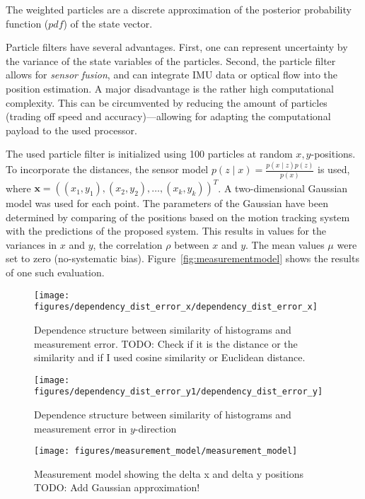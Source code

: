 \documentclass{report}
\begin{document}
The weighted particles are a discrete approximation of the posterior
probability function ($pdf$) of the state vector.

Particle filters have several advantages. First, one can represent
uncertainty by the variance of the state variables of the
particles. Second, the particle filter allows for \emph{sensor
  fusion}, and can integrate IMU data or optical flow into the
position estimation.  A major disadvantage is the rather high
computational complexity. This can be circumvented by reducing the
amount of particles (trading off speed and accuracy)---allowing for
adapting the computational payload to the used processor.

The used particle filter is initialized using 100 particles at random
$x, y$-positions. To incorporate the distances, the sensor model
$p(z \mid x) = \frac{p(x \mid z)p(z)}{p(x)}$ is used, where
$\textbf{x} = ((x_1, y_1), (x_2, y_2), \ldots, (x_k, y_k))^T$. A
two-dimensional Gaussian model was used for each point. The parameters
of the Gaussian have been determined by comparing of the positions
based on the motion tracking system with the predictions of the
proposed system. This results in values for the variances in $x$ and
$y$, the correlation $\rho$ between $x$ and $y$. The mean values $\mu$
were set to zero (no-systematic
bias). Figure~\ref{fig:measurementmodel} shows the results of one such
evaluation.

\begin{figure}[h!]
\begin{center}
  \texttt{[image: figures/dependency\_dist\_error\_x/dependency\_dist\_error\_x]}
  \caption{{\label{fig:cor_sim_confi} Dependence structure between
      similarity of histograms and measurement error.  TODO: Check if
      it is the distance or the similarity and if I used cosine
      similarity or Euclidean distance.%
    }}
\end{center}
\end{figure}

\begin{figure}[h!]
\begin{center}
\texttt{[image: figures/dependency\_dist\_error\_y1/dependency\_dist\_error\_y]}
\caption{{\label{fig:cor_sim_confi_y}
Dependence structure between similarity of histograms and measurement error in $y$-direction%
}}
\end{center}
\end{figure}

\begin{figure}[h!]
\begin{center}
\texttt{[image: figures/measurement\_model/measurement\_model]}
\caption{{Measurement model showing the delta x and delta y
    positions
TODO: Add Gaussian approximation!%
}}
\end{center}
\end{figure}
\end{document}
